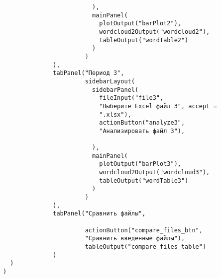 \documentclass[bachelor, och, diploma ]{SCWorks}
\begin{document}
\begin{verbatim}
                         ),
                         mainPanel(
                           plotOutput("barPlot2"),
                           wordcloud2Output("wordcloud2"),
                           tableOutput("wordTable2")
                         )
                       )
              ),
              tabPanel("Период 3",
                       sidebarLayout(
                         sidebarPanel(
                           fileInput("file3", 
                           "Выберите Excel файл 3", accept = 
                           ".xlsx"),
                           actionButton("analyze3",
                           "Анализировать файл 3"),
                           
                         ),
                         mainPanel(
                           plotOutput("barPlot3"),
                           wordcloud2Output("wordcloud3"),
                           tableOutput("wordTable3")
                         )
                       )
              ),
              tabPanel("Сравнить файлы",
                       
                       actionButton("compare_files_btn", 
                       "Сравнить введенные файлы"),
                       tableOutput("compare_files_table")
              )
  )
)


\end{verbatim}
\end{document}
